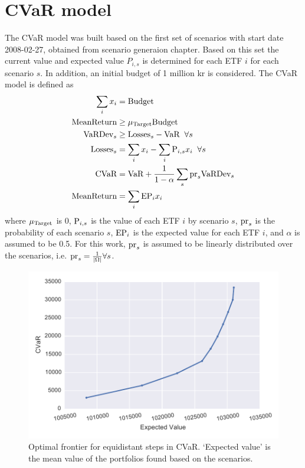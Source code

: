\section{CVaR model}\label{sec:CVaR}

The CVaR model was built based on the first set of scenarios with start date 2008-02-27, obtained from scenario generaion chapter. 
Based on this set the current value and expected value $P_{i,s}$ is determined for each ETF $i$ for each scenario $s$.
In addition, an initial budget of 1 million kr is considered.  
The CVaR model is defined as
\begin{align}
\sum_{i} x_{i} &= \textup{Budget} \\
\textup{MeanReturn} &\ge \mu_{\textup{Target}} \textup{Budget} \\
\textup{VaRDev}_{s} &\ge \textup{Losses}_{s} - \textup{VaR} \; \; \forall s \\
\textup{Losses}_{s} &= \sum_{i} x_{i} - \sum_{i} \textup{P}_{i,s} x_{i} \; \; \forall s \\
\textup{CVaR} &= \textup{VaR} + \frac{1} {1 - \alpha} \sum_{s} \textup{pr}_{s} \textup{VaRDev}_{s} \\
\textup{MeanReturn} &= \sum_{i} \textup{EP}_{i} x_{i}
\end{align}
where $ \mu_{\textup{Target}}$ is 0, $\textup{P}_{i,s}$ is the value of each ETF $i$ by scenario $s$, $\textup{pr}_{s}$ is the probability of each scenario $s$, $\textup{EP}_{i}$ is the expected value for each ETF $i$, and $\alpha$ is assumed to be 0.5.
For this work, $\textup{pr}_{s}$ is assumed to be linearly distributed over the scenarios, i.e. $\textup{pr}_{s} = \frac{1}{|\Omega|} \forall s$.

\begin{figure}[tp]
\centering
\includegraphics{../pic/frontier.pdf}
\caption{Optimal frontier for equidistant steps in CVaR. `Expected value' is the mean value of the portfolios found based on the scenarios.}
\label{fig:frontier}
\end{figure}

